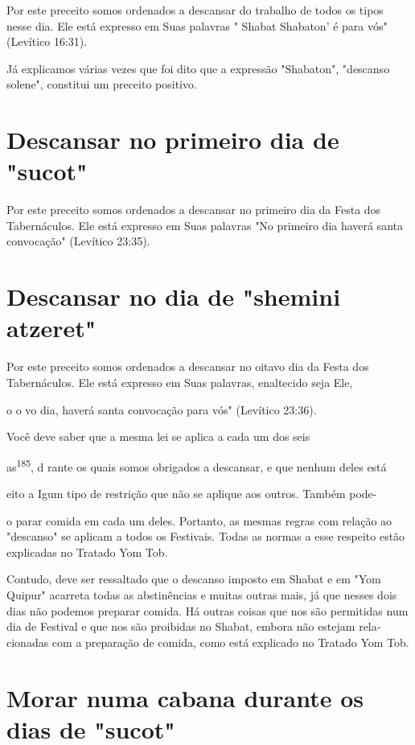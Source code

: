 \begin{itemize}
\begin{enumrate}
\begin{itemize}
\begin{itemize}
\begin{itemize}
Por este preceito somos ordenados a descansar do trabalho de to­dos os
tipos nesse dia. Ele está expresso em Suas palavras " Shabat Shabaton' é
para vós" (Levítico 16:31).

Já explicamos várias vezes que foi dito que a expressão "Shabaton",
"descanso solene", constitui um preceito positivo.

\section{Descansar no primeiro dia de "sucot"}

Por este preceito somos ordenados a descansar no primeiro dia da Festa
dos Tabernáculos. Ele está expresso em Suas palavras "No primeiro dia
haverá santa convocação" (Levítico 23:35).

\section{Descansar no dia de "shemini atzeret"}

Por este preceito somos ordenados a descansar no oitavo dia da Fes­ta
dos Tabernáculos. Ele está expresso em Suas palavras, enaltecido seja
Ele,

o o vo dia, haverá santa convocação para vós" (Levítico 23:36).


Você deve saber que a mesma lei se aplica a cada um dos seis


as\textsuperscript{185}, d rante os quais somos obrigados a descansar, e
que nenhum deles está

eito a Igum tipo de restrição que não se aplique aos outros. Também
pode-

o parar comida em cada um deles. Portanto, as mesmas regras com rela­ção
ao "descanso" se aplicam a todos os Festivais. Todas as normas a esse
res­peito estão explicadas no Tratado Yom Tob.

Contudo, deve ser ressaltado que o descanso imposto em Shabat e em "Yom
Quipur" acarreta todas as abstinências e muitas outras mais, já que
nesses dois dias não podemos preparar comida. Há outras coisas que nos
são permitidas num dia de Festival e que nos são proibidas no Shabat,
embora não estejam rela­cionadas com a preparação de comida, como está
explicado no Tratado Yom Tob.



\section{Morar numa cabana durante os dias de "sucot"}


\end{itemize}
\end{itemize}
\end{itemize}
\end{enumrate}
\end{itemize}
